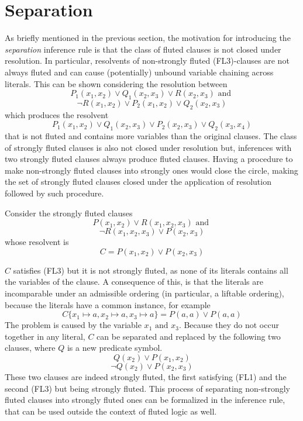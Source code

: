 \section{Separation}\label{sec:separation}
As briefly mentioned in the previous section, the motivation for introducing the \emph{separation} inference rule is that the class of fluted clauses is not closed under resolution.
In particular, resolvents of non-strongly fluted (FL3)-clauses are not always fluted and can cause (potentially) unbound variable chaining across literals.
This can be shown considering the resolution between
  \[
    P_1(x_1,x_2) \lor Q_1(x_2,x_3) \lor R(x_2,x_3) \text{ and }
  \]
  \[
  \neg R(x_1,x_2) \lor P_2(x_1,x_2) \lor Q_2(x_2,x_3)
  \]
which produces the resolvent
  \[
    P_1(x_1,x_2) \lor Q_1(x_2,x_3) \lor P_2(x_2,x_3) \lor Q_2(x_3,x_4)
  \]
that is not fluted and contains more variables than the original clauses.
The class of strongly fluted clauses is also not closed under resolution but, inferences with two strongly fluted clauses always produce fluted clauses. Having a procedure to make non-strongly fluted clauses into strongly ones would close the circle, making the set of strongly fluted clauses closed under the application of resolution followed by such procedure.

Consider the strongly fluted clauses
  \[
    P(x_1,x_2) \lor R(x_1,x_2,x_3) \text{ and }
  \]
  \[
  \neg R(x_1,x_2,x_3) \lor P(x_2,x_3)
  \]
whose resolvent is
  \[
    C = P(x_1,x_2) \lor P(x_2,x_3)
  \]

\(C\) satisfies (FL3) but it is not strongly fluted, as none of its literals contains all the variables of the clause.
A consequence of this, is that the literals are incomparable under an admissible ordering (in particular, a liftable ordering), because the literals have a common instance, for example
  \[
    C\{x_1 \mapsto a, x_2 \mapsto a, x_3 \mapsto a\} = P(a,a) \lor P(a,a)
  \]
The problem is caused by the variable \(x_1 \text{ and } x_3\). Because they do not occur together in any literal, \(C\) can be separated and replaced by the following two clauses, where \(Q\) is a new predicate symbol.
  \[
    Q(x_2) \lor P(x_1,x_2)
  \]
  \[
    \neg Q(x_2) \lor P(x_2,x_3)
  \]
These two clauses are indeed strongly fluted, the first satisfying (FL1) and the second (FL3) but being strongly fluted.
This process of separating non-strongly fluted clauses into strongly fluted ones can be formalized in the  inference rule, that can be used outside the context of fluted logic as well.

